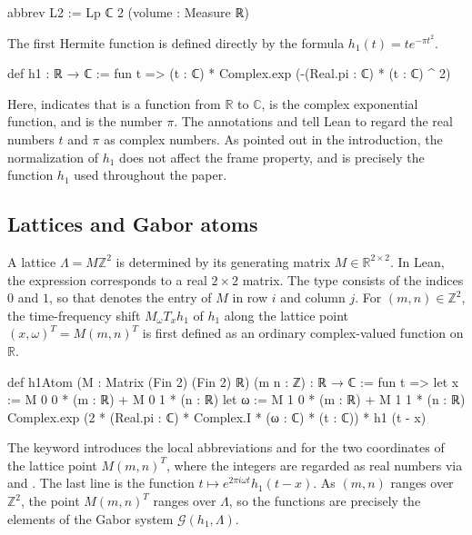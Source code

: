 \documentclass[reqno,a4paper,12pt]{amsart}
\numberwithin{equation}{section}
\newcommand{\Z}{\mathbb Z}
\newcommand{\R}{\mathbb R}
\newcommand{\C}{\mathbb C}
\newcommand{\calG}{\mathcal G}
\begin{document}
\begin{leancode}
abbrev L2 := Lp ℂ 2 (volume : Measure ℝ)
\end{leancode}

The first Hermite function is defined directly by the formula $h_1(t)=te^{-\pi t^2}$.

\begin{leancode}
def h1 : ℝ → ℂ :=
    fun t => (t : ℂ) * Complex.exp (-(Real.pi : ℂ) * (t : ℂ) ^ 2)
\end{leancode}

Here,  indicates that  is a function from $\R$ to $\C$,  is the complex exponential function, and  is the number $\pi$. The annotations  and  tell Lean to regard the real numbers $t$ and $\pi$ as complex numbers. As pointed out in the introduction, the normalization of $h_1$ does not affect the frame property, and  is precisely the function $h_1$ used throughout the paper.

\subsection{Lattices and Gabor atoms}

A lattice $\Lambda=M\Z^2$ is determined by its generating matrix $M \in \R^{2\times 2}$. In Lean, the expression  corresponds to a real $2\times2$ matrix. The type  consists of the indices $0$ and $1$, so that  denotes the entry of $M$ in row $i$ and column $j$. For $(m,n)\in\Z^2$, the time-frequency shift $M_\omega T_x h_1$ of $h_1$ along the lattice point $(x,\omega)^{T}=M(m,n)^{T}$ is first defined as an ordinary complex-valued function on $\R$.

\begin{leancode}
def h1Atom (M : Matrix (Fin 2) (Fin 2) ℝ) (m n : ℤ) : ℝ → ℂ := fun t =>
    let x := M 0 0 * (m : ℝ) + M 0 1 * (n : ℝ)
    let ω := M 1 0 * (m : ℝ) + M 1 1 * (n : ℝ)
    Complex.exp (2 * (Real.pi : ℂ) * Complex.I * (ω : ℂ) * (t : ℂ)) * h1 (t - x)
\end{leancode}

The keyword  introduces the local abbreviations  and  for the two coordinates of the lattice point $M(m,n)^{T}$, where the integers  are regarded as real numbers via  and . The last line is the function $t\mapsto e^{2\pi i\omega t}h_1(t-x)$. As $(m,n)$ ranges over $\Z^2$, the point $M(m,n)^{T}$ ranges over $\Lambda$, so the functions  are precisely the elements of the Gabor system $\calG(h_1,\Lambda)$.
\end{document}
